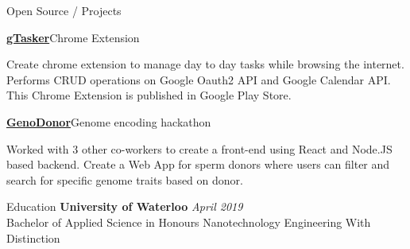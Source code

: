 \documentclass{resume}
\begin{document}
\begin{rSection}{Open Source / Projects}
\begin{rProjectSection}{\href{https://chrome.google.com/webstore/detail/gtasker-extension/lljekoepijafpdebkahcjdhbjaappami?hl=en-GB}{\textbf{gTasker}}}{Chrome Extension}
      \item Create chrome extension to manage day to day tasks while browsing the internet. Performs CRUD operations on Google Oauth2 API and Google Calendar API. This Chrome Extension is published in Google Play Store.
    \end{rProjectSection}
    \vspace{-1em}
    \begin{rProjectSection}{\href{https://github.com/Arun4rangan/GenoDonor}{\textbf{GenoDonor}}}{Genome encoding hackathon}
      \item Worked with 3 other co-workers to create a front-end using React and Node.JS based backend. Create a Web App for sperm donors where users can filter and search for specific genome traits based on donor.
    \end{rProjectSection}
  \end{rSection}
  
  \vspace{-0.5em}

  \begin{rSection}{Education}
    {\bf University of Waterloo} \hfill {\em April 2019} \\ 
    { Bachelor of Applied Science in Honours Nanotechnology Engineering With Distinction }
  \end{rSection}
\end{document}
